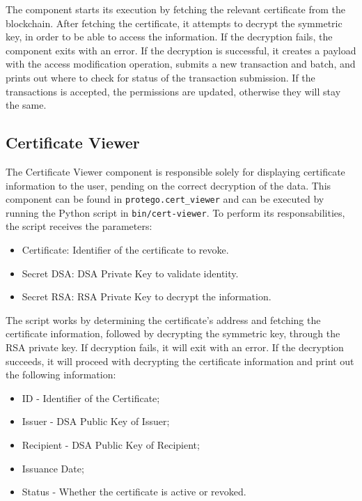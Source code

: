 The component starts its execution by fetching the relevant certificate from the blockchain. After fetching the certificate, it attempts to decrypt the symmetric key, in order to be able to access the information. If the decryption fails, the component exits with an error. If the decryption is successful, it creates a payload with the access modification operation, submits a new transaction and batch, and prints out where to check for status of the transaction submission. If the transactions is accepted, the permissions are updated, otherwise they will stay the same.

\subsection{Certificate Viewer}

The Certificate Viewer component is responsible solely for displaying certificate information to the user, pending on the correct decryption of the data.  This component can be found in \texttt{protego.cert\_viewer} and can be executed by running the Python script in \texttt{bin/cert-viewer}. To perform its responsabilities, the script receives the parameters:

\begin{itemize}
	\item Certificate: Identifier of the certificate to revoke.
	\item Secret DSA: DSA Private Key to validate identity.
	\item Secret RSA: RSA Private Key to decrypt the information.
\end{itemize}

The script works by determining the certificate's address and fetching the certificate information, followed by decrypting the symmetric key, through the RSA private key. If decryption fails, it will exit with an error. If the decryption succeeds, it will proceed with decrypting the certificate information and print out the following information:

\begin{itemize}
	\item ID - Identifier of the Certificate;
	\item Issuer - DSA Public Key of Issuer;
	\item Recipient - DSA Public Key of Recipient;
	\item Issuance Date;
	\item Status - Whether the certificate is active or revoked.
\end{itemize}

